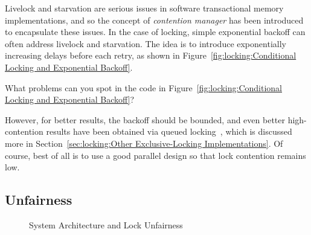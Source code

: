 Livelock and starvation are serious issues in software transactional
memory implementations, and so the concept of \emph{contention
manager} has been introduced to encapsulate these issues.
In the case of locking, simple exponential backoff can often address
livelock and starvation.
The idea is to introduce exponentially increasing delays before each
retry, as shown in
Figure~\ref{fig:locking:Conditional Locking and Exponential Backoff}.

\QuickQuiz{}
	What problems can you spot in the code in
	Figure~\ref{fig:locking:Conditional Locking and Exponential Backoff}?
 \QuickQuizEnd

However, for better results, the backoff should be bounded, and
even better high-contention results have been obtained via queued
locking~\cite{Anderson90}, which is discussed more in
Section~\ref{sec:locking:Other Exclusive-Locking Implementations}.
Of course, best of all is to use a good parallel design so that lock
contention remains low.

\subsection{Unfairness}
\label{sec:locking:Unfairness}

\begin{figure}[tb]
\centering
{}
\caption{System Architecture and Lock Unfairness}
\label{fig:lock:System Architecture and Lock Unfairness}
\end{figure}

